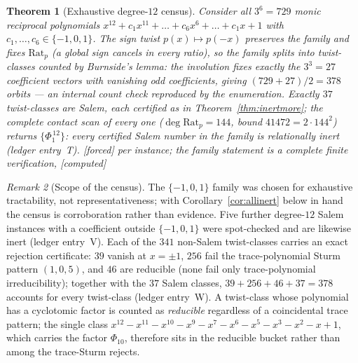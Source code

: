 \documentclass[11pt]{article}
\theoremstyle{plain}
\newtheorem{theorem}{Theorem}[section]
\theoremstyle{definition}
\theoremstyle{remark}
\newtheorem{remark}[theorem]{Remark}
\newcommand{\Rat}{\mathrm{Rat}}
\newcommand{\F}{\textnormal{[forced]}}
\newcommand{\C}{\textnormal{[computed]}}
\begin{document}
\begin{theorem}[Exhaustive degree-$12$ census]\label{thm:census}
Consider all $3^6=729$ monic reciprocal polynomials
$x^{12}+c_1x^{11}+\dots+c_6x^6+\dots+c_1x+1$ with
$c_1,\dots,c_6\in\{-1,0,1\}$. The sign twist $p(x)\mapsto p(-x)$ preserves
the family and fixes $\Rat_p$ (a global sign cancels in every ratio), so the
family splits into twist-classes counted by Burnside's lemma: the involution
fixes exactly the $3^3=27$ coefficient vectors with vanishing odd
coefficients, giving $(729+27)/2=378$ orbits --- an internal count check
reproduced by the enumeration. Exactly $37$ twist-classes are
Salem, each certified as in Theorem~\ref{thm:inertmore}; the complete
contact scan of every one ($\deg\Rat_p=144$, bound $41472=2\cdot144^2$)
returns $\{\Phi_1^{\,12}\}$: \emph{every certified Salem number in the
family is relationally inert} (ledger entry~T). \F{} per instance; the
family statement is a complete finite verification, \C
\end{theorem}

\begin{remark}[Scope of the census]\label{rem:censusscope}
The $\{-1,0,1\}$ family was chosen for exhaustive tractability, not
representativeness; with Corollary~\ref{cor:allinert} below in hand the
census is corroboration rather than evidence. Five further degree-$12$
Salem instances with a coefficient outside $\{-1,0,1\}$ were spot-checked
and are likewise inert (ledger entry~V). Each of the $341$ non-Salem
twist-classes carries an exact rejection certificate: $39$ vanish at
$x=\pm1$, $256$ fail the trace-polynomial Sturm pattern $(1,0,5)$, and $46$
are reducible (none fail only trace-polynomial irreducibility); together
with the $37$ Salem classes, $39+256+46+37=378$ accounts for every
twist-class (ledger entry~W). A twist-class whose polynomial has a cyclotomic
factor is counted as \emph{reducible} regardless of a coincidental trace
pattern; the single class $x^{12}-x^{11}-x^{10}-x^{9}-x^{7}-x^{6}-x^{5}-x^{3}-x^{2}-x+1$,
which carries the factor $\Phi_{10}$, therefore sits in the reducible bucket
rather than among the trace-Sturm rejects.
\end{remark}
\end{document}
